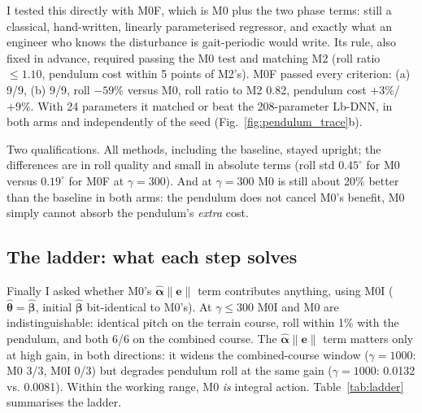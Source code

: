 \documentclass[conference]{IEEEtran}
\newcommand{\thetahat}{\hat{\bm\theta}}
\begin{document}
I tested this directly with M0F, which is M0 plus the two phase terms:
still a classical, hand-written, linearly parameterised regressor, and
exactly what an engineer who knows the disturbance is gait-periodic
would write. Its rule, also fixed in advance, required passing the M0
test and matching M2 (roll ratio $\le1.10$, pendulum cost within 5
points of M2's). M0F passed every criterion: (a) 9/9, (b) 9/9, roll
$-59\%$ versus M0, roll ratio to M2 0.82, pendulum cost $+3\%$/$+9\%$.
With 24 parameters it matched or beat the 208-parameter Lb-DNN, in both
arms and independently of the seed (Fig.~\ref{fig:pendulum_trace}b).

Two qualifications. All methods, including the baseline, stayed upright;
the differences are in roll quality and small in absolute terms (roll
std $0.45^\circ$ for M0 versus $0.19^\circ$ for M0F at $\gamma=300$).
And at $\gamma=300$ M0 is still about 20\% better than the baseline in
both arms: the pendulum does not cancel M0's benefit, M0 simply cannot
absorb the pendulum's \emph{extra} cost.

\subsection{The ladder: what each step solves}\label{sec:ladder}
Finally I asked whether M0's $\hat{\bm\alpha}\|\bm e\|$ term contributes
anything, using M0I ($\thetahat=\hat{\bm\beta}$, initial $\hat{\bm\beta}$
bit-identical to M0's). At $\gamma\le300$ M0I and M0 are
indistinguishable: identical pitch on the terrain course, roll within
1\% with the pendulum, and both 6/6 on the combined course. The
$\hat{\bm\alpha}\|\bm e\|$ term matters only at high gain, in both
directions: it widens the combined-course window ($\gamma=1000$: M0 3/3,
M0I 0/3) but degrades pendulum roll at the same gain ($\gamma=1000$:
0.0132 vs. 0.0081). Within the
working range, M0 \emph{is} integral action. Table~\ref{tab:ladder}
summarises the ladder.
\end{document}
